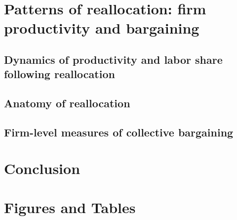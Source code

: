 \documentclass[12pt,french,american,a4paper]{article}
\begin{document}
\section{Patterns of reallocation: firm productivity and bargaining} \label{sec:Reallocation}

\subsection{Dynamics of productivity and labor share following reallocation}\label{sec:dynamics}


\subsection{Anatomy of reallocation} \label{sec:Anatomy}


\subsection{Firm-level measures of collective bargaining} \label{sec:Nego}


%


\FloatBarrier
\section{Conclusion} \label{sec:CCL}


\FloatBarrier



\newpage
\section*{Figures and Tables}



\FloatBarrier




\end{document}
